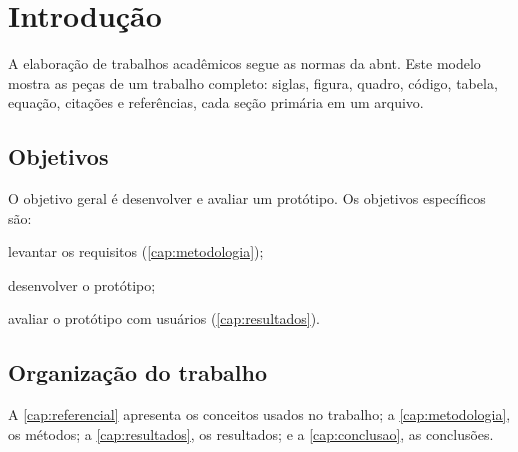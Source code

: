 \chapter{Introdução}\label{cap:introducao}

A elaboração de trabalhos acadêmicos segue as normas da \ac{abnt}. Este
modelo mostra as peças de um trabalho completo: siglas, figura, quadro,
código, tabela, equação, citações e referências, cada seção primária
em um arquivo.

\section{Objetivos}\label{sec:objetivos}

O objetivo geral é desenvolver e avaliar um protótipo. Os objetivos
específicos são:
\begin{alineas}
  \item levantar os requisitos (\autoref{cap:metodologia});
  \item desenvolver o protótipo;
  \item avaliar o protótipo com usuários (\autoref{cap:resultados}).
\end{alineas}

\section{Organização do trabalho}

A \autoref{cap:referencial} apresenta os conceitos usados no trabalho; a
\autoref{cap:metodologia}, os métodos; a \autoref{cap:resultados}, os
resultados; e a \autoref{cap:conclusao}, as conclusões.
